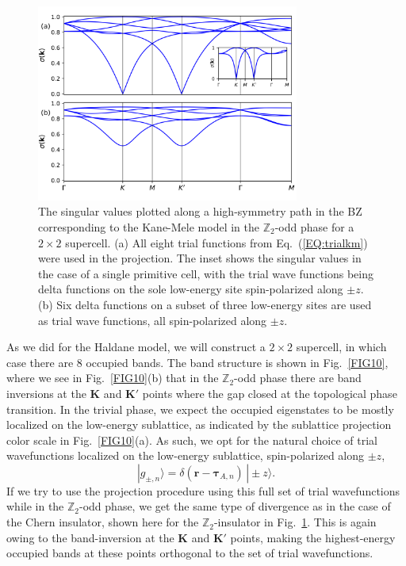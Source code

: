 \documentclass[galley,aps,pra,10pt,amsmath,amssymb,
    superscriptaddress,nofootinbib,longbibliography]{revtex4-2}
\begin{document}
\begin{figure}[t!]
\begin{center}
\includegraphics[width=3.4in]{fig11.png}
\end{center}
\vspace{-10mm}
\caption{The singular values plotted along a high-symmetry path in the BZ corresponding to the Kane-Mele model in the $\mathbb{Z}_2$-odd phase for a $2\times2$ supercell. (a) All eight trial functions from Eq.~(\ref{EQ:trialkm}) were used in the projection. The inset shows the singular values in the case of a single primitive cell, with the trial wave functions being delta functions on the sole low-energy site spin-polarized along $\pm z$. (b) Six delta functions on a subset of three low-energy sites are used as trial wave functions, all spin-polarized along $\pm z$.} 
\label{FIG11}
\end{figure}


As we did for the Haldane model, we will construct a $2\times 2$ supercell, in which case there are $8$ occupied bands. The band structure is shown in Fig.~\ref{FIG10}, where we see in Fig.~\ref{FIG10}(b) that in the $\mathbb{Z}_2$-odd phase there are band inversions at the $\mathbf{K}$ and $\mathbf{K}'$ points where the gap closed at the topological phase transition. In the trivial phase, we expect the occupied eigenstates to be mostly localized on the low-energy sublattice, as indicated by the sublattice projection color scale in Fig.~\ref{FIG10}(a). As such, we opt for the natural choice of trial wavefunctions localized on the low-energy sublattice, spin-polarized along $\pm z$,
\begin{equation}
\label{EQ:trialkm}
   | g_{\pm,n}\rangle = \delta(\mathbf{r}-\boldsymbol{\tau}_{A,n})\,|\pm z\rangle .
\end{equation}
If we try to use the projection procedure using this full set of trial wavefunctions while in the $\mathbb{Z}_2$-odd phase, we get the same type of divergence as in the case of the Chern insulator, shown here for the $\mathbb{Z}_2$-insulator in Fig.~\ref{FIG11}. This is again owing to the band-inversion at the $\mathbf{K}$ and $\mathbf{K}'$ points, making the highest-energy occupied bands at these points orthogonal to the set of trial wavefunctions. 
\end{document}

